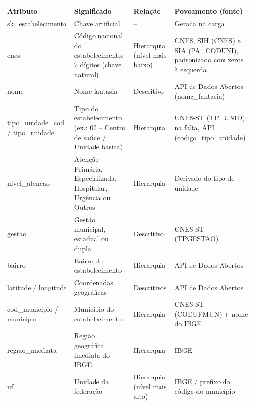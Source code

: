 \documentclass[12pt,a4paper]{article}
\begin{document}
{\small{}\begin{longtable}{|>{\raggedright\arraybackslash}p{}|>{\raggedright\arraybackslash}p{}|>{\raggedright\arraybackslash}p{}|>{\raggedright\arraybackslash}p{}|}\hline\rowcolor{azul}\color{white}\bfseries Atributo & \color{white}\bfseries Significado & \color{white}\bfseries Relação & \color{white}\bfseries Povoamento (fonte) \\ \hline\endhead
sk\_\allowbreak{}estabelecimento & Chave artificial & – & Gerada na carga \\ \hline
cnes & Código nacional do estabelecimento, 7 dígitos (chave natural) & Hierarquia (nível mais baixo) & CNES, SIH (CNES) e SIA (PA\_\allowbreak{}CODUNI), padronizado com zeros à esquerda \\ \hline
nome & Nome fantasia & Descritivo & API de Dados Abertos (nome\_\allowbreak{}fantasia) \\ \hline
tipo\_\allowbreak{}unidade\_\allowbreak{}cod / tipo\_\allowbreak{}unidade & Tipo do estabelecimento (ex.: 02 – Centro de saúde / Unidade básica) & Hierarquia & CNES-ST (TP\_\allowbreak{}UNID); na falta, API (codigo\_\allowbreak{}tipo\_\allowbreak{}unidade) \\ \hline
nivel\_\allowbreak{}atencao & Atenção Primária, Especializada, Hospitalar, Urgência ou Outros & Hierarquia & Derivado do tipo de unidade \\ \hline
gestao & Gestão municipal, estadual ou dupla & Descritivo & CNES-ST (TPGESTAO) \\ \hline
bairro & Bairro do estabelecimento & Hierarquia & API de Dados Abertos \\ \hline
latitude / longitude & Coordenadas geográficas & Descritivos & API de Dados Abertos \\ \hline
cod\_\allowbreak{}municipio / municipio & Município do estabelecimento & Hierarquia & CNES-ST (CODUFMUN) + nome do IBGE \\ \hline
regiao\_\allowbreak{}imediata & Região geográfica imediata do IBGE & Hierarquia & IBGE \\ \hline
uf & Unidade da federação & Hierarquia (nível mais alto) & IBGE / prefixo do código do município \\ \hline\end{longtable}}
\end{document}
